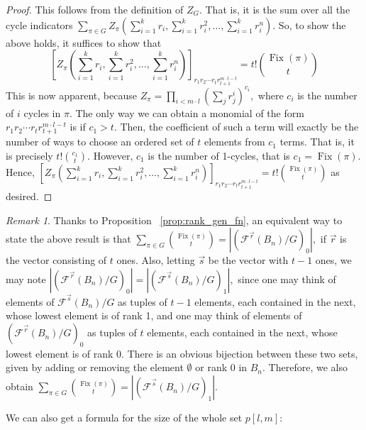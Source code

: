 \documentclass{amsart}
\theoremstyle{remark}
\newtheorem{rem}[thm]{Remark}
\renewcommand{\vec}[1]{\overrightarrow{#1}}
\def\Fix{\operatorname{Fix}}
\begin{document}
\begin{proof}
This follows from the definition of $Z_G.$ That is, it is the sum over all the cycle indicators $\sum_{\pi \in G}Z_\pi(\sum_{i=1}^k r_i,\sum_{i=1}^k r_i^2,\ldots, \sum_{i=1}^k r_i^n).$ So, to show the above holds, it suffices to show that
$$[Z_\pi(\sum_{i=1}^k r_i,\sum_{i=1}^k r_i^2,\ldots, \sum_{i=1}^k r_i^n)]_{r_1 r_2 \cdots r_t r_{t+1}^{m\cdot l - t}} =  t! \binom {\Fix(\pi)} t$$
This is now apparent, because $Z_\pi = \prod_{i < m \cdot l} (\sum_j r_j^i)^{c_i},$ where $c_i$ is the number of $i$ cycles in $\pi.$ The only way we can obtain a monomial of the form $r_1 r_2 \cdots r_t r_{t+1}^{m\cdot l - t}$ is if $c_1 > t.$ Then, the coefficient of such a term will exactly be the number of ways to choose an ordered set of $t$ elements from $c_1$ terms. That is, it is precisely $t!\binom {c_1} t.$ However, $c_1$ is the number of 1-cycles, that is $c_1 = \Fix(\pi).$ Hence, $[Z_\pi(\sum_{i=1}^k r_i,\sum_{i=1}^k r_i^2,\ldots, \sum_{i=1}^k r_i^n)]_{r_1 r_2 \cdots r_t r_{t+1}^{m\cdot l - t}} =  t!\binom {\Fix(\pi)} t$ as desired.
\end{proof}

\begin{rem}
\label{rem:box_partitions_relation_to_f}
Thanks to Proposition ~\ref{prop:rank_gen_fn}, an equivalent way to state the above result is that $\sum_{\pi \in G} \binom {\Fix(\pi)} t = |(\mathcal F^{\vec r}(B_n)/G)_0|,$ if $\vec r$ is the vector consisting of $t$ ones. Also, letting $\vec s$ be the vector with $t-1$ ones, we may note $ |(\mathcal F^{\vec r}(B_n)/G)_0| =  |(\mathcal F^{\vec s}(B_n)/G)_1|,$ since one may think of elements of 
$\mathcal F^{\vec s}(B_n)/G$ as tuples of $t-1$ elements, each contained in the next, whose lowest element is of rank 1, and one may think of elements of $(\mathcal F^{\vec r}(B_n)/G)_0$ as tuples of $t$ elements, each contained in the next, whose lowest element is of rank 0. There is an obvious bijection between these two sets, given by adding or removing the element $\emptyset$ or rank 0 in $B_n.$ Therefore, we also obtain $\sum_{\pi \in G} \binom {\Fix(\pi)} t = |(\mathcal F^{\vec s}(B_n)/G)_1|.$
\end{rem}

We can also get a formula for the size of the whole set $p[l,m]:$
\end{document}
